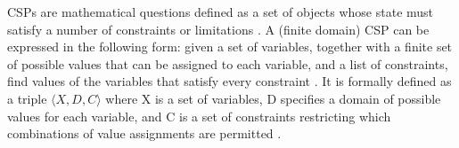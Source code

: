 







\label{sec:puzzles-as-csp}

\ac{CSP}s are mathematical questions defined as a set of objects whose state must satisfy a number of constraints or limitations \cite{ConstraintSatisfactionProblem2026}. A (finite domain) \ac{CSP} can be expressed in the following form: given a set of variables, together with a finite set of possible values that can be assigned to each variable, and a list of constraints, find values of the variables that satisfy every constraint \cite{brailsfordConstraintSatisfactionProblems1999}. It is formally defined as a triple $\langle X, D, C \rangle$ where X is a set of variables, D specifies a domain of possible values for each variable, and C is a set of constraints restricting which combinations of value assignments are permitted \cite{ConstraintSatisfactionProblem2026}.

